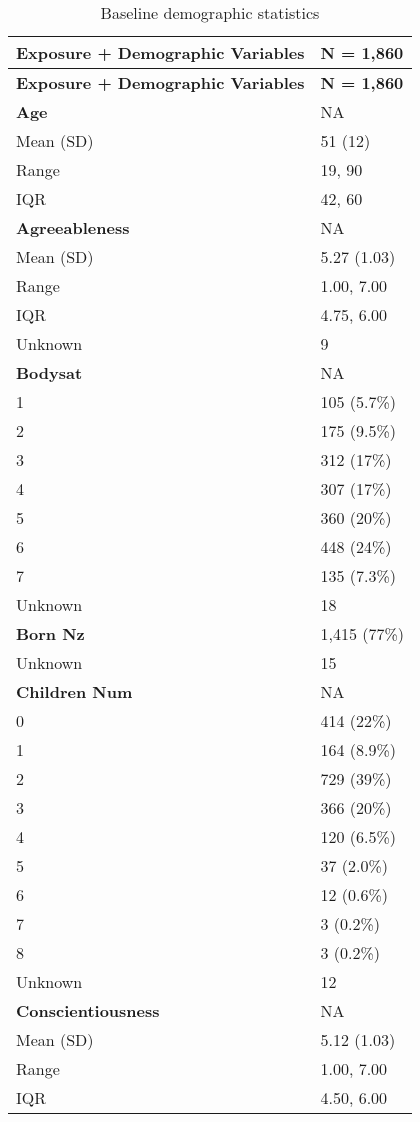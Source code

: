 \documentclass[
  singlecolumn]{article}
\begin{document}
\begin{longtable}[]{@{}ll@{}}
\caption{Baseline demographic
statistics}\label{tbl-table-demography}\tabularnewline
\toprule\noalign{}
\textbf{Exposure + Demographic Variables} & \textbf{N = 1,860} \\
\midrule\noalign{}
\endfirsthead
\toprule\noalign{}
\textbf{Exposure + Demographic Variables} & \textbf{N = 1,860} \\
\midrule\noalign{}
\endhead
\bottomrule\noalign{}
\endlastfoot
\textbf{Age} & NA \\
Mean (SD) & 51 (12) \\
Range & 19, 90 \\
IQR & 42, 60 \\
\textbf{Agreeableness} & NA \\
Mean (SD) & 5.27 (1.03) \\
Range & 1.00, 7.00 \\
IQR & 4.75, 6.00 \\
Unknown & 9 \\
\textbf{Bodysat} & NA \\
1 & 105 (5.7\%) \\
2 & 175 (9.5\%) \\
3 & 312 (17\%) \\
4 & 307 (17\%) \\
5 & 360 (20\%) \\
6 & 448 (24\%) \\
7 & 135 (7.3\%) \\
Unknown & 18 \\
\textbf{Born Nz} & 1,415 (77\%) \\
Unknown & 15 \\
\textbf{Children Num} & NA \\
0 & 414 (22\%) \\
1 & 164 (8.9\%) \\
2 & 729 (39\%) \\
3 & 366 (20\%) \\
4 & 120 (6.5\%) \\
5 & 37 (2.0\%) \\
6 & 12 (0.6\%) \\
7 & 3 (0.2\%) \\
8 & 3 (0.2\%) \\
Unknown & 12 \\
\textbf{Conscientiousness} & NA \\
Mean (SD) & 5.12 (1.03) \\
Range & 1.00, 7.00 \\
IQR & 4.50, 6.00 \\

\end{longtable}
\end{document}
